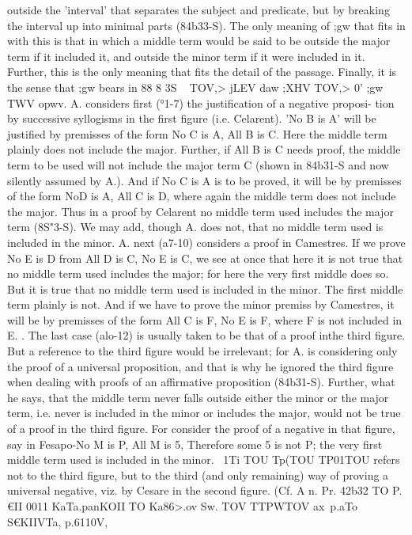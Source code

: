 {{{{{{{{{{{{{{{{{{{{{{{{{{{{{{outside the 'interval' that separates the subject and predicate,
but by breaking the interval up into minimal parts (84b33-S).
The only meaning of ;gw that fits in with this is that in which
a middle term would be said to be outside the major term if it
included it, and outside the minor term if it were included in it.
Further, this is the only meaning that fits the detail of the
passage. Finally, it is the sense that ;gw bears in 88 8 3S ~ TOV,>
jLEV daw ;XHV TOV,> 0' ;gw TWV opwv.
A. considers first (°1-7) the justification of a negative proposi-
tion by successive syllogisms in the first figure (i.e. Celarent).
'No B is A' will be justified by premisses of the form No C is A,
All B is C. Here the middle term plainly does not include the
major. Further, if All B is C needs proof, the middle term to be
used will not include the major term C (shown in 84b31-S and now
silently assumed by A.). And if No C is A is to be proved, it
will be by premisses of the form NoD is A, All C is D, where
again the middle term does not include the major. Thus in a
proof by Celarent no middle term used includes the major term
(8S"3-S). We may add, though A. does not, that no middle term
used is included in the minor.
A. next (a7-10) considers a proof in Camestres. If we prove
No E is D from All D is C, No E is C, we see at once that here it
is not true that no middle term used includes the major; for here
the very first middle does so. But it is true that no middle term
used is included in the minor. The first middle term plainly is
not. And if we have to prove the minor premiss by Camestres,
it will be by premisses of the form All C is F, No E is F, where F
is not included in E.
.
The last case (alo-12) is usually taken to be that of a proof inthe third figure. But a reference to the third figure would be
irrelevant; for A. is considering only the proof of a universal
proposition, and that is why he ignored the third figure when
dealing with proofs of an affirmative proposition (84b31-S).
Further, what he says, that the middle term never falls outside
either the minor or the major term, i.e. never is included in the
minor or includes the major, would not be true of a proof in the
third figure. For consider the proof of a negative in that figure,
say in Fesapo-No M is P, All M is 5, Therefore some 5 is not P;
the very first middle term used is included in the minor.
~1Ti TOU Tp(TOU TP01TOU refers not to the third figure, but to the
third (and only remaining) way of proving a universal negative,
viz. by Cesare in the second figure. (Cf. A n. Pr. 42b32 TO P.€II 0011
KaTa.panKOII TO Ka86>.ov Sw. TOV TTPWTOV ax~p.aTo~ S€{KIIVTa, p.6110V,
}}}}}}}}}}}}}}}}}}}}}}}}}}}}}}}
